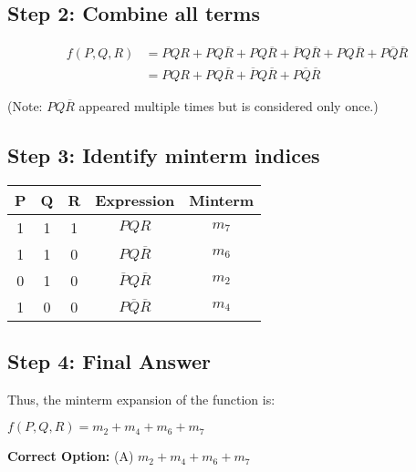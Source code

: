 \documentclass{article}
\begin{document}
\subsection*{Step 2: Combine all terms}

\begin{align*}
f(P, Q, R) &= PQR + PQ\overline{R} + PQ\overline{R} + \overline{P}Q\overline{R} + PQ\overline{R} + P\overline{Q}\overline{R} \\
&= PQR + PQ\overline{R} + \overline{P}Q\overline{R} + P\overline{Q}\overline{R}
\end{align*}

(Note: $PQ\overline{R}$ appeared multiple times but is considered only once.)

\subsection*{Step 3: Identify minterm indices}

\begin{center}
\begin{tabular}{|c|c|c|c|c|}
\hline
P & Q & R & Expression & Minterm \\
\hline
1 & 1 & 1 & $PQR$ & $m_7$ \\
1 & 1 & 0 & $PQ\overline{R}$ & $m_6$ \\
0 & 1 & 0 & $\overline{P}Q\overline{R}$ & $m_2$ \\
1 & 0 & 0 & $P\overline{Q}\overline{R}$ & $m_4$ \\
\hline
\end{tabular}
\end{center}

\subsection*{Step 4: Final Answer}

Thus, the minterm expansion of the function is:
\begin{center}
$
f(P, Q, R) = m_2 + m_4 + m_6 + m_7
$
\end{center}
\noindent \textbf{Correct Option:} (A) $m_2 + m_4 + m_6 + m_7$
\end{document}
